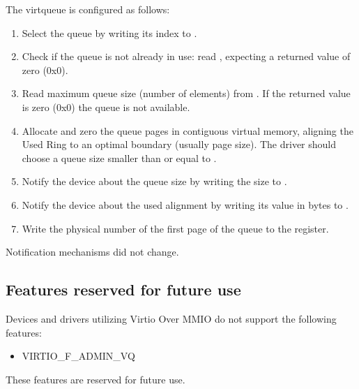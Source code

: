 The virtqueue is configured as follows:
\begin{enumerate}
\item Select the queue by writing its index to .

\item Check if the queue is not already in use: read ,
   expecting a returned value of zero (0x0).

\item Read maximum queue size (number of elements) from
   . If the returned value is zero (0x0) the
   queue is not available.

\item Allocate and zero the queue pages in contiguous virtual
   memory, aligning the Used Ring to an optimal boundary (usually
   page size). The driver should choose a queue size smaller than or
   equal to .

\item Notify the device about the queue size by writing the size to
   .

\item Notify the device about the used alignment by writing its value
   in bytes to .

\item Write the physical number of the first page of the queue to
   the  register.
\end{enumerate}

Notification mechanisms did not change.

\subsection{Features reserved for future use}\label{sec:Virtio Transport Options / Virtio Over MMIO / Features reserved for future use}

Devices and drivers utilizing Virtio Over MMIO
do not support the following features:
\begin{itemize}

\item VIRTIO_F_ADMIN_VQ

\end{itemize}

These features are reserved for future use.
